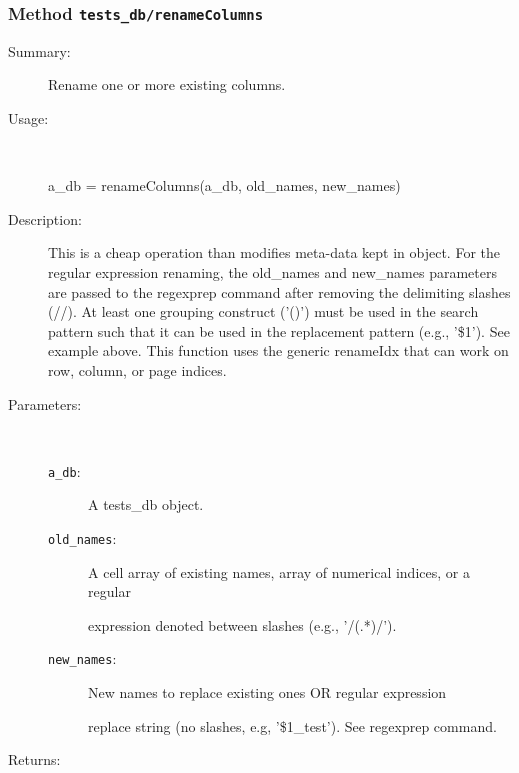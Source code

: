\subsubsection[Method \texttt{renameColumns}]{Method \texttt{tests\_db/renameColumns}}%
%
\label{ref_tests_db__renameColumns}%
\hypertarget{ref_tests_db__renameColumns}{}%
\begin{description}
\item[Summary:]Rename one or more existing columns.
%
\item[Usage:]~%
\begin{lyxcode}%
a\_db = renameColumns(a\_db, old\_names, new\_names)
%
\end{lyxcode}%
%
\item[Description:]%
This is a cheap operation than modifies meta-data kept in object. For
 the regular expression renaming, the old\_names and new\_names
 parameters are passed to the regexprep command after removing the
 delimiting slashes (//). At least one grouping construct ('()') must be
 used in the search pattern such that it can be used in the replacement
 pattern (e.g., '\$1'). See example above. This function uses the generic
 renameIdx that can work on row, column, or page indices.
\item[Parameters:]~
\begin{description}%
\item[\texttt{a\_db}:]
 A tests\_db object.
\item[\texttt{old\_names}:]
 A cell array of existing names, array of numerical indices, or a regular

expression denoted between slashes (e.g., '/(.*)/').
\item[\texttt{new\_names}:]
 New names to replace existing ones OR regular expression

replace string (no slashes, e.g, '\$1\_test'). See regexprep command.
\end{description}%
%
\item[Returns:
]~


\end{description}
